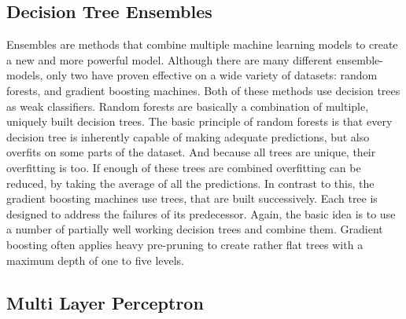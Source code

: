 \subsection{Decision Tree Ensembles}
Ensembles are methods that combine multiple machine learning models to create a new and more powerful model. Although there are many different ensemble-models, only two have proven effective on a wide variety of datasets: random forests, and gradient boosting machines. Both of these methods use decision trees as weak classifiers. Random forests are basically a combination of multiple, uniquely built decision trees. The basic principle of random forests is that every decision tree is inherently capable of making adequate predictions, but also overfits on some parts of the dataset. And because all trees are unique, their overfitting is too. If enough of these trees are combined overfitting can be reduced, by taking the average of all the predictions. In contrast to this, the gradient boosting machines use trees, that are built successively. Each tree is designed to address the failures of its predecessor. Again, the basic idea is to use a number of partially well working decision trees and combine them. Gradient boosting often applies heavy pre-pruning to create rather flat trees with a maximum depth of one to five levels. 
 
%
\subsection{Multi Layer Perceptron}




